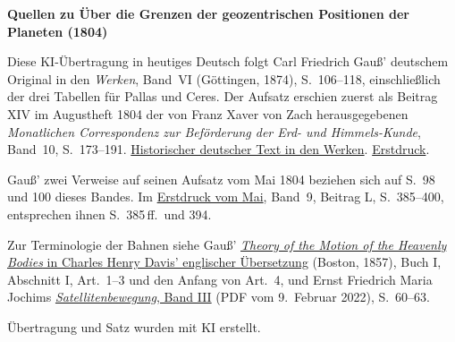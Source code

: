 \clearpage\thispagestyle{empty}
\begin{center}\textbf{Quellen zu Über die Grenzen der geozentrischen Positionen der Planeten (1804)}\end{center}
\noindent Diese KI-Übertragung in heutiges Deutsch folgt Carl Friedrich Gauß’ deutschem Original in den \textit{Werken}, Band~VI (Göttingen, 1874), S.~106--118, einschließlich der drei Tabellen für Pallas und Ceres. Der Aufsatz erschien zuerst als Beitrag XIV im Augustheft 1804 der von Franz Xaver von Zach herausgegebenen \textit{Monatlichen Correspondenz zur Beförderung der Erd- und Himmels-Kunde}, Band~10, S.~173--191. \href{https://gdz.sub.uni-goettingen.de/id/PPN236007467}{Historischer deutscher Text in den Werken}. \href{https://www.digitale-sammlungen.de/en/view/bsb10538602?page=181}{Erstdruck}.
\par\smallskip\noindent Gauß’ zwei Verweise auf seinen Aufsatz vom Mai 1804 beziehen sich auf S.~98 und 100 dieses Bandes. Im \href{https://www.digitale-sammlungen.de/en/view/bsb10538601?page=421}{Erstdruck vom Mai}, Band~9, Beitrag L, S.~385--400, entsprechen ihnen S.~385\,ff.\ und 394.
\par\smallskip\noindent Zur Terminologie der Bahnen siehe Gauß’ \href{https://www2.karlin.mff.cuni.cz/~tuma/Aplikace21/theoryofmotionof00gausuoft.pdf#page=28}{\textit{Theory of the Motion of the Heavenly Bodies} in Charles Henry Davis’ englischer Übersetzung} (Boston, 1857), Buch I, Abschnitt I, Art.~1--3 und den Anfang von Art.~4, und Ernst Friedrich Maria Jochims \href{https://elib.dlr.de/94028/1/SAB-III-gesamt-2022-02-09.pdf#page=74}{\textit{Satellitenbewegung}, Band III} (PDF vom 9.\ Februar 2022), S.~60--63.
\par\smallskip\noindent Übertragung und Satz wurden mit KI erstellt.
\clearpage
